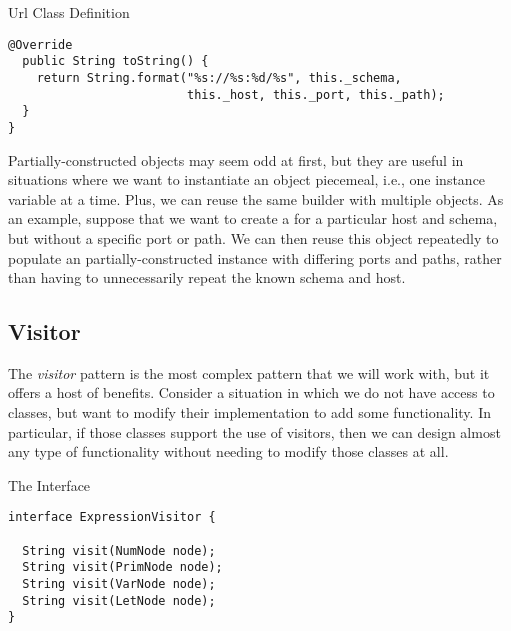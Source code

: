 \begin{verbnobox}[\footnotesize]
\begin{cl}{Url Class Definition}
\begin{lstlisting}[language=MyJava]
  @Override
  public String toString() {
    return String.format("%s://%s:%d/%s", this._schema,
                         this._host, this._port, this._path);
  }
}
\end{lstlisting}
\end{cl}

Partially-constructed objects may seem odd at first, but they are useful in situations where we want to instantiate an object piecemeal, i.e., one instance variable at a time. Plus, we can reuse the same builder with multiple objects. As an example, suppose that we want to create a  for a particular host and schema, but without a specific port or path. We can then reuse this object repeatedly to populate an partially-constructed instance with differing ports and paths, rather than having to unnecessarily repeat the known schema and host.

\subsection*{Visitor}

The \textit{visitor} pattern is the most complex pattern that we will work with, but it offers a host of benefits. Consider a situation in which we do not have access to classes, but want to modify their implementation to add some functionality. In particular, if those classes support the use of visitors, then we can design almost any type of functionality without needing to modify those classes at all.


\begin{cl}[]{The  Interface}
\begin{lstlisting}[language=MyJava]
interface ExpressionVisitor {
  
  String visit(NumNode node);
  String visit(PrimNode node);
  String visit(VarNode node);
  String visit(LetNode node);
}
\end{lstlisting}
\end{cl}


\end{verbnobox}
